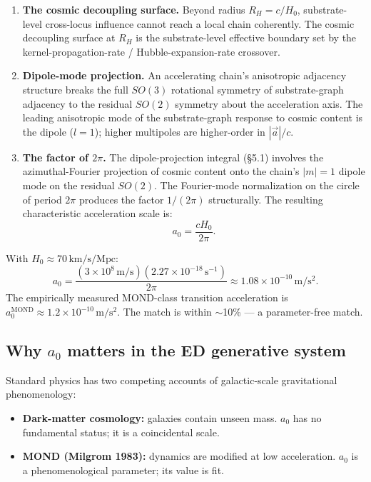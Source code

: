 \documentclass[11pt,a4paper]{article}
\begin{document}
\begin{enumerate}[noitemsep]
\item \textbf{The cosmic decoupling surface.} Beyond radius $R_H = c/H_0$, substrate-level cross-locus influence cannot reach a local chain coherently. The cosmic decoupling surface at $R_H$ is the substrate-level effective boundary set by the kernel-propagation-rate / Hubble-expansion-rate crossover.
\item \textbf{Dipole-mode projection.} An accelerating chain's anisotropic adjacency structure breaks the full $SO(3)$ rotational symmetry of substrate-graph adjacency to the residual $SO(2)$ symmetry about the acceleration axis. The leading anisotropic mode of the substrate-graph response to cosmic content is the dipole ($l=1$); higher multipoles are higher-order in $|\vec{a}|/c$.
\item \textbf{The factor of $2\pi$.} The dipole-projection integral (\S5.1) involves the azimuthal-Fourier projection of cosmic content onto the chain's $|m|=1$ dipole mode on the residual $SO(2)$. The Fourier-mode normalization on the circle of period $2\pi$ produces the factor $1/(2\pi)$ structurally. The resulting characteristic acceleration scale is:
\[
a_0 = \frac{cH_0}{2\pi}.
\]
\end{enumerate}

With $H_0 \approx 70\,\mathrm{km/s/Mpc}$:
\[
a_0 = \frac{(3 \times 10^8\,\mathrm{m/s})(2.27 \times 10^{-18}\,\mathrm{s^{-1}})}{2\pi} \approx 1.08 \times 10^{-10}\,\mathrm{m/s^2}.
\]
The empirically measured MOND-class transition acceleration is $a_0^\mathrm{MOND} \approx 1.2 \times 10^{-10}\,\mathrm{m/s^2}$. The match is within $\sim$10\% --- a parameter-free match.

\subsection{Why $a_0$ matters in the ED generative system}

Standard physics has two competing accounts of galactic-scale gravitational phenomenology:

\begin{itemize}[noitemsep]
\item \textbf{Dark-matter cosmology:} galaxies contain unseen mass. $a_0$ has no fundamental status; it is a coincidental scale.
\item \textbf{MOND (Milgrom 1983):} dynamics are modified at low acceleration. $a_0$ is a phenomenological parameter; its value is fit.
\end{itemize}
\end{document}
